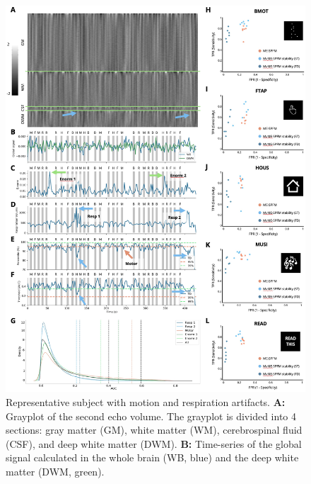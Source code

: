 \begin{figure}[ht!]
    \centerline{\includegraphics[width=\textwidth]{figures/multivariate/artifacts.jpg}}
    \caption{Representative subject with motion and respiration artifacts.
    \textbf{A:} Grayplot of the second echo volume. The grayplot is divided into
    4 sections: gray matter (GM), white matter (WM), cerebrospinal fluid (CSF),
    and deep white matter (DWM). \textbf{B:} Time-series of the global signal
    calculated in the whole brain (WB, blue) and the deep white matter (DWM,
    green).}
\label{fig:artifacts}
\end{figure}
